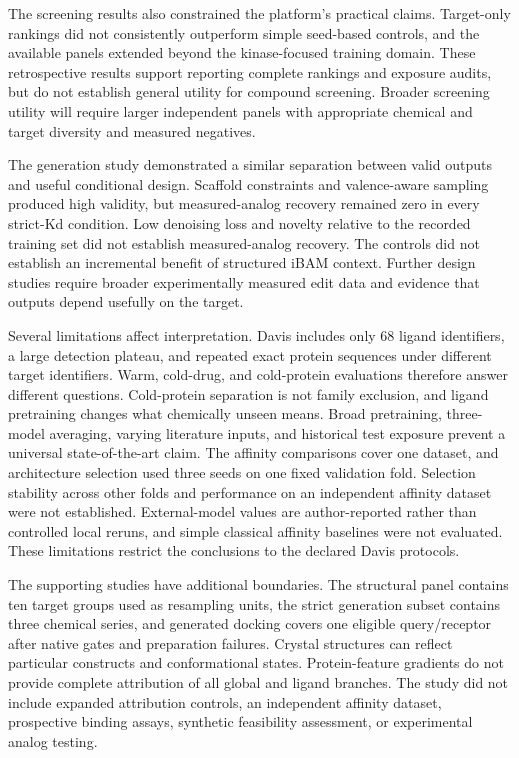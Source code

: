 \documentclass[12pt,a4paper]{article}
\begin{document}
The screening results also constrained the platform's practical claims. Target-only rankings did not consistently outperform simple seed-based controls, and the available panels extended beyond the kinase-focused training domain. These retrospective results support reporting complete rankings and exposure audits, but do not establish general utility for compound screening. Broader screening utility will require larger independent panels with appropriate chemical and target diversity and measured negatives.

The generation study demonstrated a similar separation between valid outputs and useful conditional design. Scaffold constraints and valence-aware sampling produced high validity, but measured-analog recovery remained zero in every strict-Kd condition. Low denoising loss and novelty relative to the recorded training set did not establish measured-analog recovery. The controls did not establish an incremental benefit of structured iBAM context. Further design studies require broader experimentally measured edit data and evidence that outputs depend usefully on the target.

Several limitations affect interpretation. Davis includes only 68 ligand identifiers, a large detection plateau, and repeated exact protein sequences under different target identifiers. Warm, cold-drug, and cold-protein evaluations therefore answer different questions. Cold-protein separation is not family exclusion, and ligand pretraining changes what chemically unseen means. Broad pretraining, three-model averaging, varying literature inputs, and historical test exposure prevent a universal state-of-the-art claim. The affinity comparisons cover one dataset, and architecture selection used three seeds on one fixed validation fold. Selection stability across other folds and performance on an independent affinity dataset were not established. External-model values are author-reported rather than controlled local reruns, and simple classical affinity baselines were not evaluated. These limitations restrict the conclusions to the declared Davis protocols.

The supporting studies have additional boundaries. The structural panel contains ten target groups used as resampling units, the strict generation subset contains three chemical series, and generated docking covers one eligible query/receptor after native gates and preparation failures. Crystal structures can reflect particular constructs and conformational states. Protein-feature gradients do not provide complete attribution of all global and ligand branches. The study did not include expanded attribution controls, an independent affinity dataset, prospective binding assays, synthetic feasibility assessment, or experimental analog testing.
\end{document}
